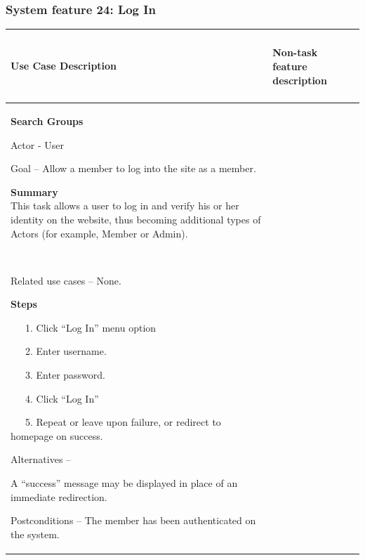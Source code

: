 \documentclass[letterpaper]{article}
\newcommand\textstyleDefaultParagraphFont[1]{#1}
\begin{document}
\bigskip


\bigskip

\subsubsection[System feature 24: Log In]{\rmfamily System feature 24:
Log In}
\begin{flushleft}
\tablehead{}
\begin{supertabular}{|m{3.17056in}|m{3.1712599in}|}
\hline
\bfseries\color{black} Use Case Description &
\paragraph[Non{}-task feature
description]{\rmfamily Non-task feature
description}
\\\hline
{\bfseries\color{black} Search Groups}

{\color{black} Actor - User}

{\color{black} Goal -- Allow a member to log into the site as a member.}

{\color{black}
\textstyleDefaultParagraphFont{\textbf{Summary}}\textstyleDefaultParagraphFont{\textbf{\ \ }}\newline
\textstyleDefaultParagraphFont{This task allows a user to log in and
verify his or her identity on the website, thus becoming additional
types of Actors (for example, Member or Admin).}}

~

{\color{black} Related use cases -- None.}

{\color{black} \textstyleDefaultParagraphFont{\textbf{Steps}}}

{\color{black} \ \ \ 1. Click {\textquotedblleft}Log
In{\textquotedblright} menu option }

{\color{black} \ \ \ 2. Enter username.}

{\color{black} \ \ \ 3. Enter password.}

{\color{black} \ \ \ 4. Click {\textquotedblleft}Log
In{\textquotedblright}}

{\color{black} \ \ \ 5. Repeat or leave upon failure, or redirect to
homepage on success.}

{\color{black} Alternatives -- }

{\color{black} A {\textquotedblleft}success{\textquotedblright} message
may be displayed in place of an immediate redirection.}

\color{black} Postconditions -- The member has been authenticated on the
system. &

\end{supertabular}
\end{flushleft}
\end{document}
